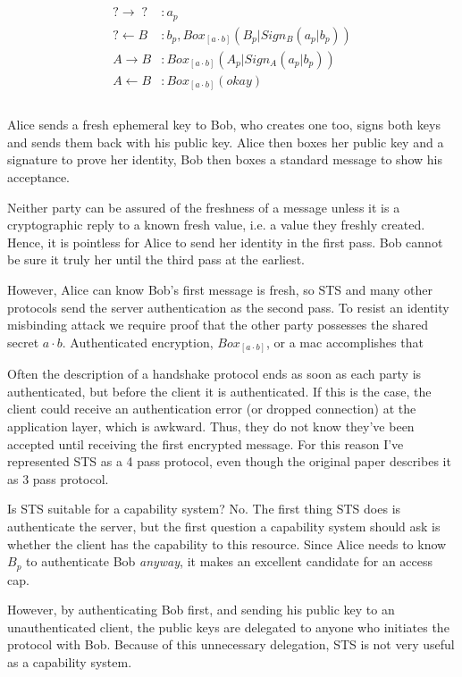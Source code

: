 \documentclass[12pt]{article}
\begin{document}
$$
\begin{align*}
\\
    ? \to \;?\;   &: a_p \\
    ? \gets B &: b_p, Box_{[a\cdot b]}(B_p | Sign_B(a_p|b_p)) \\
    A \to B   &: Box_{[a\cdot b]}(A_p | Sign_A(a_p | b_p)) \\
    A \gets B &: Box_{[a\cdot b]}(okay) \\
\\
\end{align*}
$$

Alice sends a fresh ephemeral key to Bob, who creates one too,
signs both keys and sends them back with his public key.
Alice then boxes her public key and a signature to prove her identity,
Bob then boxes a standard message to show his acceptance.

Neither party can be assured of the freshness of a message
unless it is a cryptographic reply to a known fresh value,
i.e. a value they freshly created. Hence, it is pointless for Alice
to send her identity in the first pass. Bob cannot be sure it truly her
until the third pass at the earliest.

However, Alice can know Bob's first message is fresh, so STS and many
other protocols send the server authentication as the second pass.
To resist an identity misbinding attack we require proof that the
other party possesses the shared secret $a\cdot b$. Authenticated encryption,
$Box_{[a\cdot b]}$, or a mac accomplishes that \cite[section 3.1]{sigma}

Often the description of a handshake protocol ends as soon
as each party is authenticated, but before the client 
it is authenticated. If this is the case, the client  could receive
an authentication error (or dropped connection) at the application
layer, which is awkward. Thus, they do not know they've been accepted
until receiving the first encrypted message. For this reason
I've represented STS as a 4 pass protocol, even though the original
paper describes it as 3 pass protocol.

Is STS suitable for a capability system? No. The first thing STS
does is authenticate the server, but the first question a capability
system should ask is whether the client has the capability to
this resource. Since Alice needs to know $B_p$ to authenticate
Bob \emph{anyway}, it makes an excellent candidate for an access cap.

However, by authenticating Bob first, and sending his public key to
an unauthenticated client, the public keys are delegated to anyone
who initiates the protocol with Bob. Because of this unnecessary
delegation, STS is not very useful as a capability system.
\end{document}
